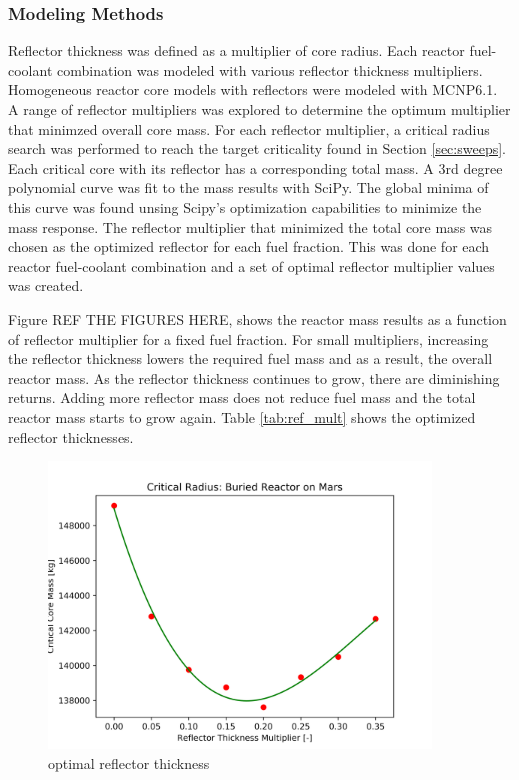 \subsubsection{Modeling Methods}
Reflector thickness was defined as a multiplier of core radius. Each reactor
fuel-coolant combination was modeled with various reflector thickness
multipliers. Homogeneous reactor core models with reflectors were modeled with
MCNP6.1. A range of reflector multipliers was explored to determine the optimum
multiplier that minimzed overall core mass. For each reflector multiplier, a critical radius search was performed
to reach the target criticality found in Section \ref{sec:sweeps}. Each
critical core with its reflector has a corresponding total mass. A 3rd degree
polynomial curve was fit to the mass results with SciPy\citep{scipy}. The global
minima of this curve was found unsing Scipy's optimization capabilities to
minimize the mass response. The
reflector multiplier that minimized the total core mass was chosen as the
optimized reflector for each fuel fraction.
This was done for each reactor fuel-coolant combination and a set of optimal
reflector multiplier values was created.

Figure REF THE FIGURES HERE, shows the reactor mass results as a function of
reflector multiplier for a fixed fuel fraction. For small multipliers, increasing the reflector thickness
lowers the required fuel mass and as a result, the overall reactor mass. As the
reflector thickness continues to grow, there are diminishing returns. Adding
more reflector mass does not reduce fuel mass and the total reactor mass starts
to grow again. Table \ref{tab:ref_mult} shows the optimized reflector
thicknesses.

\begin{figure}[h]
    \centering
    \includegraphics[width=4in]{../images/opt_refl_CO2_UO2.png}
\caption{\codiox \uox optimal reflector thickness}
\label{fig:uo2_co2_refl}
\end{figure}

